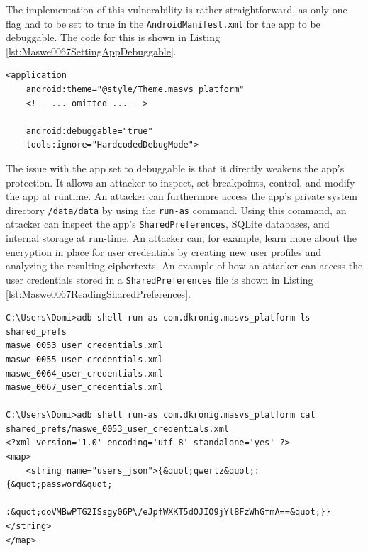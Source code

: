 The implementation of this vulnerability is rather straightforward, as only one flag had to be set to true in the \texttt{AndroidManifest.xml} for the app to be debuggable. The code for this is shown in Listing \ref{lst:Maswe0067SettingAppDebuggable}.

\begin{lstlisting}[style=XMLStyle, float=tbh, captionpos=b, caption={Setting the app to debuggable in \texttt{AndroidManifest.xml}}, label={lst:Maswe0067SettingAppDebuggable}]
<application
    android:theme="@style/Theme.masvs_platform"
    <!-- ... omitted ... -->
    
    android:debuggable="true"
    tools:ignore="HardcodedDebugMode">
\end{lstlisting}

The issue with the app set to debuggable is that it directly weakens the app's protection. It allows an attacker to inspect, set breakpoints, control, and modify the app at runtime. An attacker can furthermore access the app's private system directory \texttt{/data/data} by using the \texttt{run-as} command. Using this command, an attacker can inspect the app's \texttt{SharedPreferences}, SQLite databases, and internal storage at run-time. An attacker can, for example, learn more about the encryption in place for user credentials by creating new user profiles and analyzing the resulting ciphertexts. An example of how an attacker can access the user credentials stored in a \texttt{SharedPreferences} file is shown in Listing \ref{lst:Maswe0067ReadingSharedPreferences}.

\begin{lstlisting}[style=TerminalStyle, float=tbh, captionpos=b, caption={Listing and reading \texttt{SharedPreferences} files containing user credentials}, label={lst:Maswe0067ReadingSharedPreferences}]
C:\Users\Domi>adb shell run-as com.dkronig.masvs_platform ls shared_prefs
maswe_0053_user_credentials.xml
maswe_0055_user_credentials.xml
maswe_0064_user_credentials.xml
maswe_0067_user_credentials.xml

C:\Users\Domi>adb shell run-as com.dkronig.masvs_platform cat shared_prefs/maswe_0053_user_credentials.xml
<?xml version='1.0' encoding='utf-8' standalone='yes' ?>
<map>
    <string name="users_json">{&quot;qwertz&quot;:{&quot;password&quot;
        :&quot;doVMBwPTG2ISsgy06P\/eJpfWXKT5dOJIO9jYl8FzWhGfmA==&quot;}}</string>
</map>
\end{lstlisting}